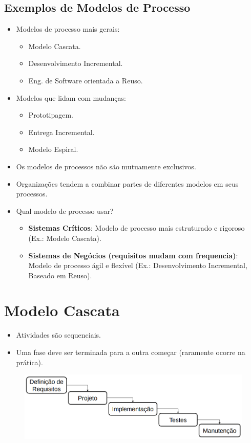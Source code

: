 \documentclass[a4paper, 11pt]{article}
\begin{document}
\subsection{Exemplos de Modelos de Processo}
\begin{itemize}
    \item Modelos de processo mais gerais:
    \begin{itemize}
        \item Modelo Cascata.
        \item Desenvolvimento Incremental.
        \item Eng. de Software orientada a Reuso.
    \end{itemize}
    \item Modelos que lidam com mudanças:
    \begin{itemize}
        \item Prototipagem.
        \item Entrega Incremental.
        \item Modelo Espiral.
    \end{itemize} 
    \item Os modelos de processos não são mutuamente exclusivos.
    \item Organizações tendem a combinar partes de diferentes modelos em seus processos.
    \item Qual modelo de processo usar?
    \begin{itemize}
        \item \textbf{Sistemas Críticos}: Modelo de processo mais estruturado e rigoroso (Ex.: Modelo Cascata).
        \item \textbf{Sistemas de Negócios (requisitos mudam com frequencia)}: Modelo de processo ágil e flexível (Ex.: Desenvolvimento Incremental, Baseado em Reuso).
    \end{itemize} 
\end{itemize}

\section{Modelo Cascata}
\begin{itemize}
    \item Atividades são sequenciais.
    \item Uma fase deve ser terminada para a outra começar (raramente ocorre na prática).    
\end{itemize}

\begin{figure}[h]
    \includegraphics[width=14cm]{modelo_cascata}
    \centering
\end{figure}
\end{document}

